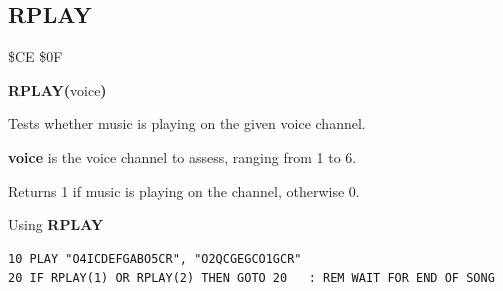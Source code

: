 \subsection{RPLAY}
\begin{description}[leftmargin=2cm,style=nextline]
\item [Token:]    \$CE \$0F

\item [Format:]   {\bf RPLAY(}voice{\bf)}

\item [Returns:]  Tests whether music is playing on the given voice channel.

                  {\bf voice} is the voice channel to assess, ranging from 1 to 6.

                  Returns 1 if music is playing on the channel, otherwise 0.

\item [Example:]  Using {\bf RPLAY}

\begin{tcolorbox}[colback=black,coltext=white]
\verbatimfont{\codefont}
\begin{verbatim}
10 PLAY "O4ICDEFGABO5CR", "O2QCGEGCO1GCR"
20 IF RPLAY(1) OR RPLAY(2) THEN GOTO 20   : REM WAIT FOR END OF SONG
\end{verbatim}
\end{tcolorbox}
\end{description}


\newpage
